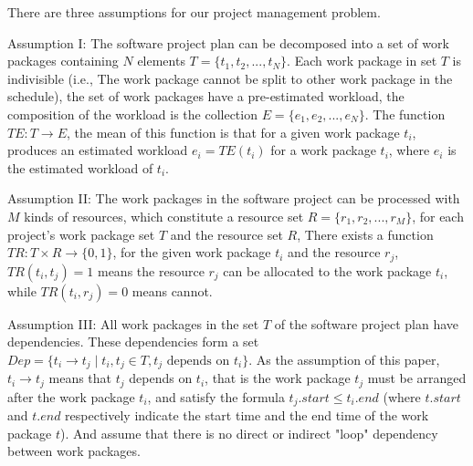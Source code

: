 %
There are three assumptions for our project management problem.

Assumption I: The software project plan can be decomposed into a set of
work packages containing $N$ elements $T = \{t_1, t_2, ..., t_N \}$.
Each work package in set $T$ is indivisible (i.e., The work package cannot be
split to other work package in the schedule), the set of work packages have a
pre-estimated workload, the composition of the workload is the collection
$E = \{e _1, e_2, ..., e_N \}$. The function $TE: T \rightarrow E$,
the mean of this function is that for a given work package $t_i$, produces an
estimated workload $e_i = TE(t_i)$ for a work package $t_i$, where $e_i$ is the
estimated workload of $t_i$.


Assumption II: The work packages in the software project  can be
processed with $M$ kinds of resources, which constitute a resource set
$R = \{r_1, r_2, ..., r_M \}$, for each project's work package set $T$ and the
resource set $R$, There exists a function $TR: T \times R \rightarrow \{0, 1\}$,
for the given work package $t_i$ and the resource $r_j$, $TR(t_i, t_j) = 1$
means the resource $r_j$ can be allocated to the work package $t_i$, while
$TR(t_i, r_j) = 0$ means cannot.


Assumption III: All work packages in the set $T$ of the software project
plan have dependencies. These dependencies form a set
$Dep= \{t_i \rightarrow t_j \mid t_i, t_j \in T, t_j \text{ depends on } t_i\}$.
As the assumption of this paper, $t_i \rightarrow t_j$ means that $t_j$ depends
on $t_i$, that is the work package $t_j$ must be arranged after the work
package $t_i$, and satisfy the formula $t_j.start \leq t_i.end$ (where $t.start$
and $t.end$ respectively indicate the start time and the end time of the work
package $t$).  And assume that there is no direct or indirect "loop" dependency
between work packages.


  \vspace{-2mm}


